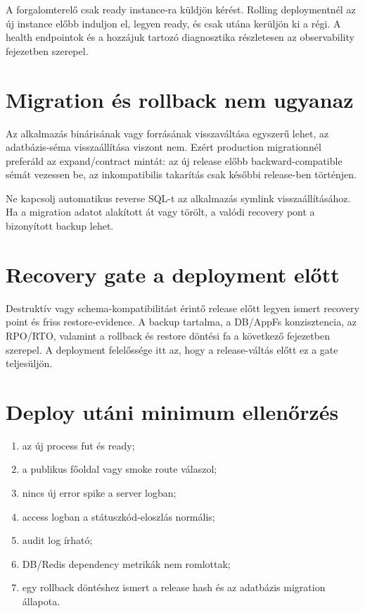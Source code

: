 A forgalomterelő csak ready instance-ra küldjön kérést. Rolling deploymentnél az új instance előbb induljon el, legyen ready, és csak utána kerüljön ki a régi. A health endpointok és a hozzájuk tartozó diagnosztika részletesen az observability fejezetben szerepel.

\section{Migration és rollback nem ugyanaz}

Az alkalmazás binárisának vagy forrásának visszaváltása egyszerű lehet, az adatbázis-séma visszaállítása viszont nem. Ezért production migrationnél preferáld az expand/contract mintát: az új release előbb backward-compatible sémát vezessen be, az inkompatibilis takarítás csak későbbi release-ben történjen.

Ne kapcsolj automatikus reverse SQL-t az alkalmazás symlink visszaállításához. Ha a migration adatot alakított át vagy törölt, a valódi recovery pont a bizonyított backup lehet.

\section{Recovery gate a deployment előtt}

Destruktív vagy schema-kompatibilitást érintő release előtt legyen ismert recovery point és friss restore-evidence. A backup tartalma, a DB/AppFs konzisztencia, az RPO/RTO, valamint a rollback és restore döntési fa a következő fejezetben szerepel. A deployment felelőssége itt az, hogy a release-váltás előtt ez a gate teljesüljön.

\section{Deploy utáni minimum ellenőrzés}

\begin{enumerate}
  \item az új process fut és ready;
  \item a publikus főoldal vagy smoke route válaszol;
  \item nincs új error spike a server logban;
  \item access logban a státuszkód-eloszlás normális;
  \item audit log írható;
  \item DB/Redis dependency metrikák nem romlottak;
  \item egy rollback döntéshez ismert a release hash és az adatbázis migration állapota.
\end{enumerate}
